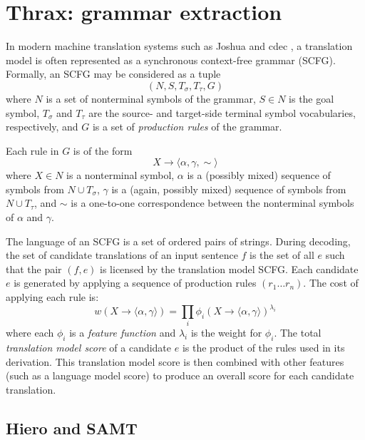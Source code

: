 \documentclass[11pt]{article}
\begin{document}
\section{Thrax: grammar extraction}

In modern machine translation systems such as Joshua \cite{Joshua-WMT} and cdec \cite{cdec}, a translation model is often represented as a synchronous context-free grammar (SCFG). Formally, an SCFG may be considered as a tuple
$$(N,S,T_\sigma,T_\tau,G)$$
where $N$ is a set of nonterminal symbols of the grammar, $S \in N$ is the goal symbol, $T_\sigma$ and $T_\tau$ are the source- and target-side terminal symbol vocabularies, respectively, and $G$ is a set of {\em production rules} of the grammar.

Each rule in $G$ is of the form
$$X \to \langle \alpha , \gamma , \sim \rangle$$
where $X \in N$ is a nonterminal symbol, $\alpha$ is a (possibly mixed) sequence of symbols from $N \cup T_\sigma$, $\gamma$ is a (again, possibly mixed) sequence of symbols from $N \cup T_\tau$, and $\sim$ is a one-to-one correspondence between the nonterminal symbols of $\alpha$ and $\gamma$.

The language of an SCFG is a set of ordered pairs of strings. During
decoding, the set of candidate translations of an input sentence $f$
is the set of all $e$ such that the pair $(f,e)$ is licensed by the
translation model SCFG.  Each candidate $e$ is generated by applying a
sequence of production rules $(r_1 \ldots r_n)$.  The cost of applying each rule is:
%
\begin{equation}
w(X \to \langle \alpha, \gamma \rangle) = \prod_i{\phi_i(X \to \langle \alpha , \gamma \rangle)^{\lambda_i}}
\end{equation}
%
where each $\phi_i$ is a {\em feature function} and $\lambda_i$ is the
weight for $\phi_i$.  The total {\em translation model score} of a
candidate $e$ is the product of the rules used in its derivation.
This translation model score is then combined with other features
(such as a language model score) to produce an overall score for each
candidate translation.

\subsection{Hiero and SAMT}
\end{document}
